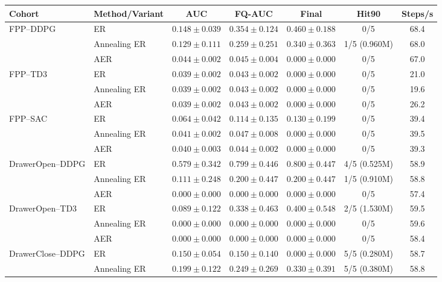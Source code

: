 \begin{table}[t]
\centering
\small
\setlength{\tabcolsep}{4pt}
\begin{tabular}{llccccc}
\toprule
Cohort & Method/Variant & AUC & FQ-AUC & Final & Hit90 & Steps/s \\
\midrule
FPP--DDPG & ER & \(0.148\pm0.039\) & \(0.354\pm0.124\) &
\(0.460\pm0.188\) & 0/5 & 68.4 \\
 & Annealing ER & \(0.129\pm0.111\) & \(0.259\pm0.251\) &
\(0.340\pm0.363\) & 1/5 (0.960M) & 68.0 \\
 & AER & \(0.044\pm0.002\) & \(0.045\pm0.004\) &
\(0.000\pm0.000\) & 0/5 & 67.0 \\
\addlinespace[2pt]
FPP--TD3 & ER & \(0.039\pm0.002\) & \(0.043\pm0.002\) &
\(0.000\pm0.000\) & 0/5 & 21.0 \\
 & Annealing ER & \(0.039\pm0.002\) & \(0.043\pm0.002\) &
\(0.000\pm0.000\) & 0/5 & 19.6 \\
 & AER & \(0.039\pm0.002\) & \(0.043\pm0.002\) &
\(0.000\pm0.000\) & 0/5 & 26.2 \\
\addlinespace[2pt]
FPP--SAC & ER & \(0.064\pm0.042\) & \(0.114\pm0.135\) &
\(0.130\pm0.199\) & 0/5 & 39.4 \\
 & Annealing ER & \(0.041\pm0.002\) & \(0.047\pm0.008\) &
\(0.000\pm0.000\) & 0/5 & 39.5 \\
 & AER & \(0.040\pm0.003\) & \(0.044\pm0.002\) &
\(0.000\pm0.000\) & 0/5 & 39.3 \\
\addlinespace[2pt]
DrawerOpen--DDPG & ER & \(0.579\pm0.342\) & \(0.799\pm0.446\) &
\(0.800\pm0.447\) & 4/5 (0.525M) & 58.9 \\
 & Annealing ER & \(0.111\pm0.248\) & \(0.200\pm0.447\) &
\(0.200\pm0.447\) & 1/5 (0.910M) & 58.8 \\
 & AER & \(0.000\pm0.000\) & \(0.000\pm0.000\) &
\(0.000\pm0.000\) & 0/5 & 57.4 \\
\addlinespace[2pt]
DrawerOpen--TD3 & ER & \(0.089\pm0.122\) & \(0.338\pm0.463\) &
\(0.400\pm0.548\) & 2/5 (1.530M) & 59.5 \\
 & Annealing ER & \(0.000\pm0.000\) & \(0.000\pm0.000\) &
\(0.000\pm0.000\) & 0/5 & 59.6 \\
 & AER & \(0.000\pm0.000\) & \(0.000\pm0.000\) &
\(0.000\pm0.000\) & 0/5 & 58.4 \\
\addlinespace[2pt]
DrawerClose--DDPG & ER & \(0.150\pm0.054\) & \(0.150\pm0.140\) &
\(0.000\pm0.000\) & 5/5 (0.280M) & 58.7 \\
 & Annealing ER & \(0.199\pm0.122\) & \(0.249\pm0.269\) &
\(0.330\pm0.391\) & 5/5 (0.380M) & 58.8 \\

\end{tabular}
\end{table}
